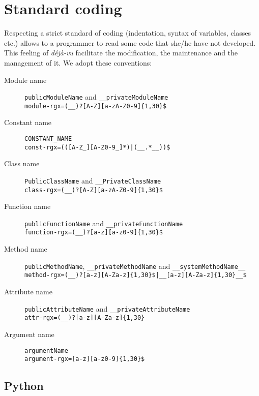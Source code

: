 \documentclass[a4paper, 12pt, oneside]{report}
\begin{document}
\chapter{Standard coding\label{Standard coding}}
Respecting a strict standard of coding (indentation, syntax of variables, classes etc.) allows to a programmer to read some code that she/he have not developed. This feeling of \textit{déjà-vu} facilitate the modification, the maintenance and the management of it. We adopt these conventions:
\begin{description}
	\item[Module name]	\texttt{publicModuleName} and \texttt{\_\_privateModuleName}\\
	\verb#module-rgx=(__)?[A-Z][a-zA-Z0-9]{1,30}$#
	\item[Constant name]	\texttt{CONSTANT\_NAME}\\
	\verb#const-rgx=(([A-Z_][A-Z0-9_]*)|(__.*__))$#
	\item[Class name]	\texttt{PublicClassName} and \texttt{\_\_PrivateClassName}\\
	\verb#class-rgx=(__)?[A-Z][a-zA-Z0-9]{1,30}$#
	\item[Function name]	\texttt{publicFunctionName} and \texttt{\_\_privateFunctionName}\\
	\verb#function-rgx=(__)?[a-z][a-z0-9]{1,30}$#
	\item[Method name]	\texttt{publicMethodName}, \texttt{\_\_privateMethodName} and \texttt{\_\_systemMethodName\_\_}\\
	\verb#method-rgx=(__)?[a-z][A-Za-z]{1,30}$|__[a-z][A-Za-z]{1,30}__$#
	\item[Attribute name]	\texttt{publicAttributeName} and \texttt{\_\_privateAttributeName}\\
	\verb#attr-rgx=(__)?[a-z][A-Za-z]{1,30}#
	\item[Argument name]	\texttt{argumentName}\\
	\verb#argument-rgx=[a-z][a-z0-9]{1,30}$#
\end{description}


\section{Python}
\end{document}
